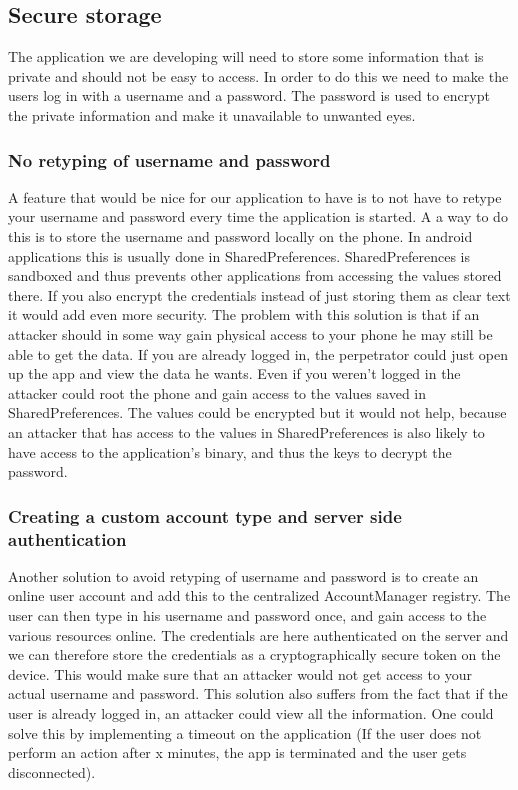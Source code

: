 \subsection{Secure storage}
The application we are developing will need to store some information that is private and should not be easy to access. In order to do this we need to make the users log in with a username and a password. The password is used to encrypt the private information and make it unavailable to unwanted eyes.  

\subsubsection{No retyping of username and password}
A feature that would be nice for our application to have is to not have to retype your username and password every time the application is started.
\newline
\newline
A a way to do this is to store the username and password locally on the phone. In android applications this is usually done in SharedPreferences. SharedPreferences is sandboxed and thus prevents other applications from accessing the values stored there. If you also encrypt the credentials instead of just storing them as clear text it would add even more security.
\newline
\newline
The problem with this solution is that if an attacker should in some way gain physical access to your phone he may still be able to get the data. If you are already logged in, the perpetrator could just open up the app and view the data he wants. Even if you weren’t logged in the attacker could root the phone and gain access to the values saved in SharedPreferences. The values could be encrypted but it would not help, because an attacker that has access to the values in SharedPreferences is also likely to have access to the application’s binary, and thus the keys to decrypt the password.


\subsubsection{Creating a custom account type and server side authentication}
Another solution to avoid retyping of username and password is to create an online user account and add this to the centralized AccountManager registry. The user can then type in his username and password once, and gain access to the various resources online. The credentials are here authenticated on the server and we can therefore store the credentials as a cryptographically secure token on the device. This would make sure that an attacker would not get access to your actual username and password.
\newline
\newline
This solution also suffers from the fact that if the user is already logged in, an attacker could view all the information. One could solve this by implementing a timeout on the application (If the user does not perform an action after x minutes, the app is terminated and the user gets disconnected).

